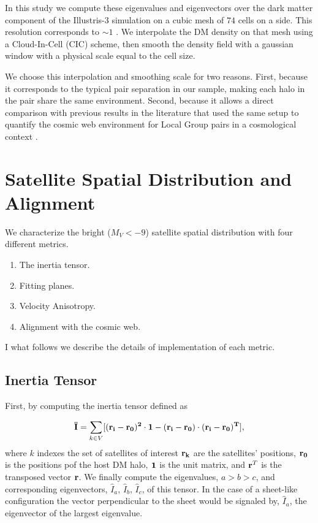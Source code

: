 \documentclass[useAMS,usenatbib,usegraphicx]{mn2e}
\newcommand{\hMpc}{{\ifmmode{h^{-1}{\rm Mpc}}\else{$h^{-1}$Mpc}\fi}}
\begin{document}
In this study we compute these eigenvalues and eigenvectors over the
dark matter component of the Illustris-3 simulation on a cubic mesh of
$74$ cells on a side. 
This resolution corresponds to $\sim 1$ \hMpc.
We interpolate the DM density on that mesh using a Cloud-In-Cell (CIC)
scheme, then smooth the density field with a gaussian window with a
physical scale equal to the cell size. 

We choose this interpolation and smoothing scale for two reasons.
First, because it corresponds to the typical pair separation in our
sample, making each halo in the pair share the same environment.
Second, because it allows a direct comparison with previous results in
the literature that used the same setup to quantify the cosmic
web environment for Local Group pairs in a cosmological context
\citep{ForeroRomero2013,2015ApJ...799...45F}.  

\section{Satellite Spatial Distribution and Alignment}
\label{sec:SpatialMeasurements}

We characterize the bright ($M_V<-9$) satellite spatial distribution
with four different metrics. 

\begin{enumerate}
\item{The inertia tensor}.
\item{Fitting planes}.
\item{Velocity Anisotropy}.
\item{Alignment with the cosmic web}. 
\end{enumerate}

I what follows we describe the details of implementation of each
metric.


\subsection{Inertia Tensor}
\label{sub:inertia}
First, by computing the inertia tensor defined as 

\begin{equation}
{\bf{\bar{I}}} = \sum_{k \in V}[(\bf{r}_i - \bf{r}_0)^2\cdot \bf{1} -
  (\bf{r}_i-\bf{r}_0)\cdot (\bf{r}_i - \bf{r}_0)^{T}],
\end{equation}
%
where $k$ indexes the set of satellites of interest
$\bf{r}_k$ are the satellites' positions, $\bf{r}_{0}$ is the
positions pof the host DM halo, $\bf{1}$ is the unit matrix,  and
${\bf r}^T$ is the transposed vector $\bf{r}$. 
We finally compute the eigenvalues, $a>b>c$, and corresponding
eigenvectors, $\hat{I}_a$, $\hat{I}_b$, $\hat{I}_c$, of this tensor.
In the case of a sheet-like configuration the vector perpendicular to
the sheet would be signaled by, $\hat{I}_a$, the eigenvector of the
largest eigenvalue. 
\end{document}
